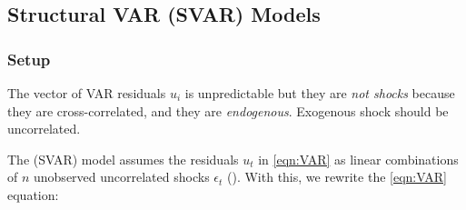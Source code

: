     \subsection{Structural VAR (SVAR) Models}

        \subsubsection{Setup}
        
            The vector of VAR residuals $u_i$ is unpredictable but they are \emph{not shocks} because they are cross-correlated, and they are \emph{endogenous}. Exogenous shock should be uncorrelated.
    
            The  (SVAR) model assumes the residuals $u_t$ in \ref{eqn:VAR} as linear combinations of $n$ unobserved uncorrelated shocks $\epsilon_t$ (). With this, we rewrite the \ref{eqn:VAR} equation:
    
